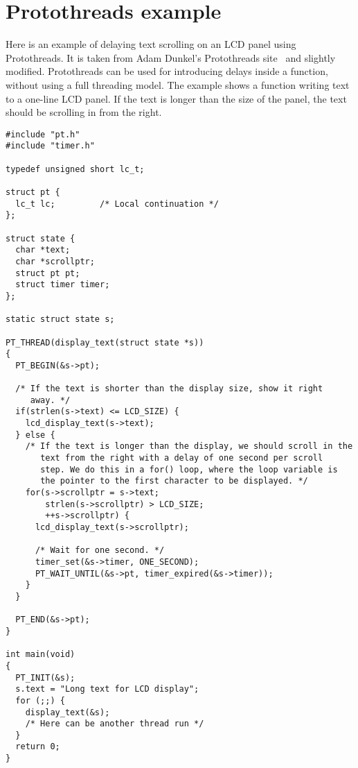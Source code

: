 

\chapter{Protothreads example}\label{app:protothreads}
Here is an example of delaying text scrolling on an LCD panel using Protothreads.
It is taken from
Adam Dunkel's Protothreads site~\cite{adam-protothreads} and slightly modified.
Protothreads can be used for introducing delays inside a function, without using a full threading model.
The example shows a function writing text to a one-line LCD panel.
If the text is longer than the size of the panel, the text should be scrolling in from the right. 

\begin{lstlisting}
#include "pt.h"
#include "timer.h"

typedef unsigned short lc_t;

struct pt {
  lc_t lc;         /* Local continuation */
}; 

struct state {
  char *text;
  char *scrollptr;
  struct pt pt;
  struct timer timer;
};

static struct state s;
 
PT_THREAD(display_text(struct state *s))
{
  PT_BEGIN(&s->pt);
 
  /* If the text is shorter than the display size, show it right
     away. */
  if(strlen(s->text) <= LCD_SIZE) {
    lcd_display_text(s->text);
  } else {    
    /* If the text is longer than the display, we should scroll in the
       text from the right with a delay of one second per scroll
       step. We do this in a for() loop, where the loop variable is
       the pointer to the first character to be displayed. */
    for(s->scrollptr = s->text;
        strlen(s->scrollptr) > LCD_SIZE;
        ++s->scrollptr) {
      lcd_display_text(s->scrollptr);
 
      /* Wait for one second. */
      timer_set(&s->timer, ONE_SECOND);
      PT_WAIT_UNTIL(&s->pt, timer_expired(&s->timer));
    }
  }
  
  PT_END(&s->pt);
}

int main(void)
{
  PT_INIT(&s);
  s.text = "Long text for LCD display";
  for (;;) {
    display_text(&s);
    /* Here can be another thread run */
  }
  return 0;
}

\end{lstlisting}

